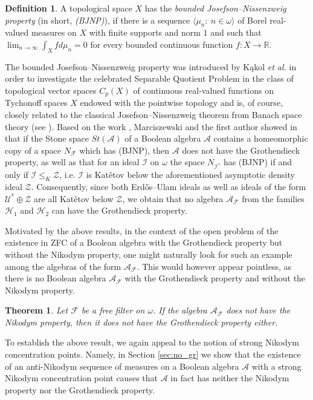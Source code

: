 \documentclass[a4paper,11pt,fleqn]{amsart}
\newtheorem{theoreml}{Theorem}[section]
\theoremstyle{definition}
\newtheorem{definition}[theorem]{Definition}
\theoremstyle{remark}
\numberwithin{equation}{section}
\newcommand{\N}{\mathbb{N}}
\newcommand{\aA}{\mathcal{A}}
\newcommand{\fF}{\mathcal{F}}
\newcommand{\hH}{\mathcal{H}}
\newcommand{\iI}{\mathcal{I}}
\newcommand{\uU}{\mathcal{U}}
\newcommand{\zZ}{\mathcal{Z}}
\newcommand{\seqn}[1]{\big\langle#1\colon\ n\io\big\rangle}
\newcommand{\io}{\in\omega}%
\newcommand{\erdos}{{Erd\H{o}s}}
\begin{document}
\begin{definition}\label{def:bjnp}
A topological space $X$ has the \textit{bounded Josefson--Nissenzweig property} (in short, \textit{(BJNP)}), if there is a sequence $\seqn{\mu_n}$ of Borel real-valued measures on $X$ with finite supports and norm $1$ and such that $\lim_{n\to\infty}\int_{X}fd\mu_n=0$ for every bounded continuous function $f\colon X\to\mathbb{R}$. 
\end{definition}

The bounded Josefson--Nissenzweig property was introduced by K\k{a}kol \textit{et al.} \cite{KMSZ} in order to investigate the celebrated Separable Quotient Problem in the class of topological vector spaces $C_p(X)$ of continuous real-valued functions on Tychonoff spaces $X$ endowed with the pointwise topology and is, of course, closely related to the classical Josefson--Nissenzweig theorem from Banach space theory (see \cite[Chapter XII]{Die84}). Based on the work \cite{KSZ23}, Marciszewski and the first author showed in \cite{MS24} that if the Stone space $St(\aA)$ of a Boolean algebra $\aA$ contains a homeomorphic copy of a space $N_\fF$ which has (BJNP), then $\aA$ does not have the Grothendieck property, as well as that for an ideal $\iI$ on $\omega$ the space $N_{\iI^*}$ has (BJNP) if and only if $\iI\le_K\zZ$, i.e. $\iI$ is Kat\v{e}tov below the aforementioned asymptotic density ideal $\zZ$. Consequently, since both \erdos--Ulam ideals as well as ideals of the form $\uU^*\oplus\zZ$ are all Kat\v{e}tov below $\zZ$, we obtain that no algebra $\aA_\fF$ from the families $\hH_1$ and $\hH_2$ can have the Grothendieck property.

\medskip

Motivated by the above results, in the context of the open problem of the existence in \textsf{ZFC} of a Boolean algebra with the Grothendieck property but without the Nikodym property, one might naturally look for such an example among the algebras of the form $\aA_\fF$. This would however appear pointless, as there is no Boolean algebra $\aA_\fF$ with the Grothendieck property and without the Nikodym property.

\begin{theoreml}\label{thm:main_af_no_nik_no_gr}
Let $\fF$ be a free filter on $\omega$. If the algebra $\aA_{\fF}$ does not have the Nikodym property, then it does not have the Grothendieck property either.
\end{theoreml}

To establish the above result, we again appeal to the notion of strong Nikodym concentration points. Namely, in Section \ref{sec:no_gr} we show that the existence of an anti-Nikodym sequence of measures on a Boolean algebra $\aA$ with a strong Nikodym concentration point causes that $\aA$ in fact has neither the Nikodym property nor the Grothendieck property.
\end{document}
